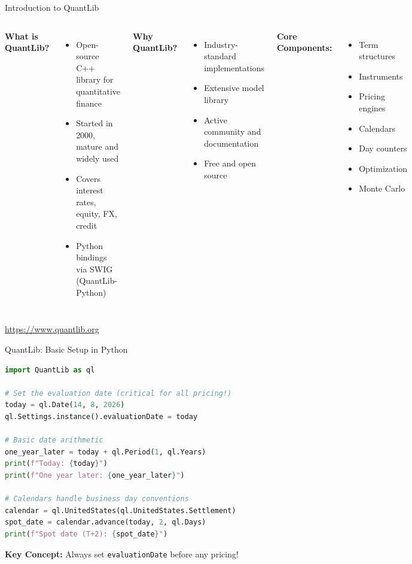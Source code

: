 \documentclass[aspectratio=169,11pt]{beamer}
\begin{document}
\begin{frame}{Introduction to QuantLib}
\begin{columns}
\textbf{What is QuantLib?}
\begin{itemize}
    \item Open-source C++ library for quantitative finance
    \item Started in 2000, mature and widely used
    \item Covers interest rates, equity, FX, credit
    \item Python bindings via SWIG (QuantLib-Python)
\end{itemize}

\vspace{0.3cm}
\textbf{Why QuantLib?}
\begin{itemize}
    \item Industry-standard implementations
    \item Extensive model library
    \item Active community and documentation
    \item Free and open source
\end{itemize}

\textbf{Core Components:}
\begin{itemize}
    \item Term structures
    \item Instruments
    \item Pricing engines
    \item Calendars
    \item Day counters
    \item Optimization
    \item Monte Carlo
\end{itemize}
\end{columns}

\vspace{0.3cm}
\url{https://www.quantlib.org}
\end{frame}

\begin{frame}[fragile]{QuantLib: Basic Setup in Python}
\begin{lstlisting}[language=Python]
import QuantLib as ql

# Set the evaluation date (critical for all pricing!)
today = ql.Date(14, 8, 2026)
ql.Settings.instance().evaluationDate = today

# Basic date arithmetic
one_year_later = today + ql.Period(1, ql.Years)
print(f"Today: {today}")
print(f"One year later: {one_year_later}")

# Calendars handle business day conventions
calendar = ql.UnitedStates(ql.UnitedStates.Settlement)
spot_date = calendar.advance(today, 2, ql.Days)
print(f"Spot date (T+2): {spot_date}")
\end{lstlisting}

\textbf{Key Concept:} Always set \texttt{evaluationDate} before any pricing!
\end{frame}
\end{document}
